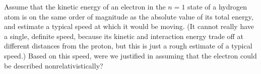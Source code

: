 Assume that the kinetic energy of an electron in the $n=1$
state of a hydrogen atom is on the same order of magnitude
as the absolute value of its total energy, and estimate a
typical speed at which it would be moving. (It cannot really
have a single, definite speed, because its kinetic and
interaction energy trade off at different distances from the
proton, but this is just a rough estimate of a typical
speed.) Based on this speed, were we justified in assuming
that the electron could be described nonrelativistically?

